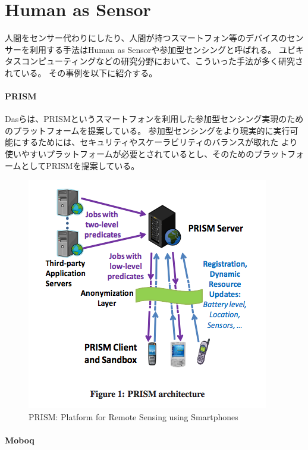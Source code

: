 \section{Human as Sensor}\label{human-as-sensor}

人間をセンサー代わりにしたり、人間が持つスマートフォン等のデバイスのセンサーを利用する手法はHuman
as Sensorや参加型センシング\cite{participatory-sensing}と呼ばれる。
ユビキタスコンピューティング\cite{weiser1991computer}などの研究分野において、こういった手法が多く研究されている。
その事例を以下に紹介する。

\paragraph{PRISM}\label{prism}

\mbox{}

Dasらは、PRISM\cite{prism}というスマートフォンを利用した参加型センシング実現のためのプラットフォームを提案している。
参加型センシングをより現実的に実行可能にするためには、セキュリティやスケーラビリティのバランスが取れた
より使いやすいプラットフォームが必要とされているとし、そのためのプラットフォームとしてPRISMを提案している。

\begin{figure}[htbp]
  \begin{center}
  \includegraphics[width=.6\linewidth,bb=0 0 399 384]{images/prism.png}
  \end{center}
  \caption{PRISM: Platform for Remote Sensing using Smartphones}
  \label{fig:prism}
\end{figure}

\paragraph{Moboq}\label{moboq}

